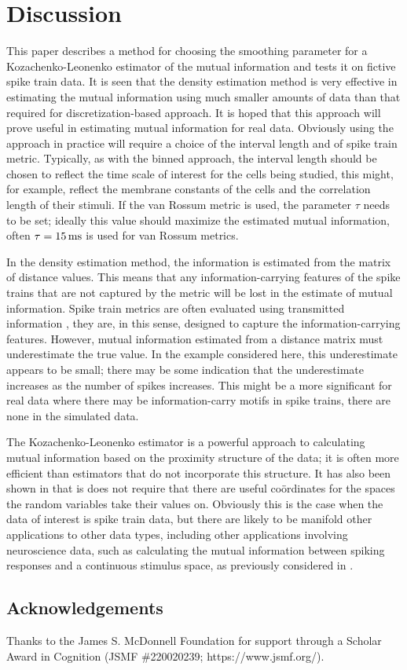 \documentclass[12pt]{article}
\newcommand{\ms}{\mbox{\,ms}}
\begin{document}
\section{Discussion}

This paper describes a method for choosing the smoothing parameter for
a Kozachenko-Leonenko estimator of the mutual information and tests it
on fictive spike train data. It is seen that the density estimation
method is very effective in estimating the mutual information using
much smaller amounts of data than that required for
discretization-based approach. It is hoped that this approach will
prove useful in estimating mutual information for real data. Obviously
using the approach in practice will require a choice of the interval
length and of spike train metric. Typically, as with the binned
approach, the interval length should be chosen to reflect the time
scale of interest for the cells being studied, this might, for
example, reflect the membrane constants of the cells and the
correlation length of their stimuli. If the van Rossum metric is used,
the parameter $\tau$ needs to be set; ideally this value should
maximize the estimated mutual information, often $\tau=15\ms$ is used
for van Rossum metrics.

In the density estimation method, the information is estimated from
the matrix of distance values. This means that any
information-carrying features of the spike trains that are not
captured by the metric will be lost in the estimate of mutual
information. Spike train metrics are often evaluated using transmitted
information \citep{VictorPurpura1996,HoughtonVictor2010}, they are, in
this sense, designed to capture the information-carrying
features. However, mutual information estimated from a distance matrix
must underestimate the true value. In the example considered here,
this underestimate appears to be small; there may be some indication
that the underestimate increases as the number of spikes
increases. This might be a more significant for real data where there
may be information-carry motifs in spike trains, there are none in
the simulated data. 

The Kozachenko-Leonenko estimator is a powerful approach to
calculating mutual information based on the proximity structure of the
data; it is often more efficient than estimators that do not
incorporate this structure. It has also been shown in
\citet{Houghton2015} that is does not require that there are useful
co\"{o}rdinates for the spaces the random variables take their values
on.  Obviously this is the case when the data of interest is spike
train data, but there are likely to be manifold other applications to
other data types, including other applications involving neuroscience
data, such as calculating the mutual information between spiking
responses and a continuous stimulus space, as previously considered in
\cite{PanzeriEtAl1999}.


\subsection*{Acknowledgements} Thanks to the  James S. McDonnell Foundation for support through a  Scholar Award in Cognition (JSMF \#220020239; https://www.jsmf.org/). 

{}

\end{document}
